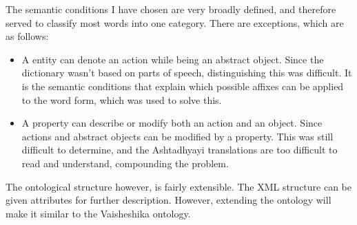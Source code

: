 \documentclass[final, 12pt]{elsarticle}
\begin{document}
The semantic conditions I have chosen are very broadly defined, and therefore served to classify most words into one category. There are exceptions, which are as follows:
\begin{itemize}
    \item A entity can denote an action while being an abstract object. Since the dictionary wasn't based on parts of speech, distinguishing this was difficult. It is the semantic conditions that explain which possible affixes can be applied to the word form, which was used to solve this.
    \item A property can describe or modify both an action and an object. Since actions and abstract objects can be modified by a property. This was still difficult to determine, and the Ashtadhyayi translations are too difficult to read and understand, compounding the problem.
\end{itemize}

The ontological structure however, is fairly extensible. The XML structure can be given attributes for further description. However, extending the ontology will make it similar to the Vaisheshika ontology.



\end{document}
